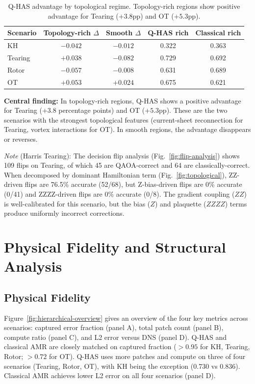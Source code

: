 \documentclass[12pt, a4paper, oneside]{report}
\begin{document}
\begin{table}[H]
\centering
\caption{Q-HAS advantage by topological regime. Topology-rich regions show positive advantage for Tearing ($+3.8$pp) and OT ($+5.3$pp).}
\label{tab:topo-regime}
\begin{tabular}{lcccc}
\toprule
\textbf{Scenario} & \textbf{Topology-rich $\Delta$} & \textbf{Smooth $\Delta$} & \textbf{Q-HAS rich} & \textbf{Classical rich} \\
\midrule
KH      & $-0.042$ & $-0.012$ & 0.322 & 0.363 \\
Tearing & $\mathbf{+0.038}$ & $-0.082$ & 0.729 & 0.692 \\
Rotor   & $-0.057$ & $-0.008$ & 0.631 & 0.689 \\
OT      & $\mathbf{+0.053}$ & $+0.024$ & 0.675 & 0.621 \\
\bottomrule
\end{tabular}
\end{table}

\textbf{Central finding:} In topology-rich regions, Q-HAS shows a positive advantage for Tearing ($+3.8$ percentage points) and OT ($+5.3$pp). These are the two scenarios with the strongest topological features (current-sheet reconnection for Tearing, vortex interactions for OT). In smooth regions, the advantage disappears or reverses.

\textit{Note} (Harris Tearing): The decision flip analysis (Fig.~\ref{fig:flip-analysis}) shows 109 flips on Tearing, of which 45 are QAOA-correct and 64 are classically-correct.  When decomposed by dominant Hamiltonian term (Fig.~\ref{fig:topological}), ZZ-driven flips are 76.5\% accurate (52/68), but Z-bias-driven flips are 0\% accurate (0/41) and ZZZZ-driven flips are 0\% accurate (0/8).  The gradient coupling ($ZZ$) is well-calibrated for this scenario, but the bias ($Z$) and plaquette ($ZZZZ$) terms produce uniformly incorrect corrections.

\section{Physical Fidelity and Structural Analysis}

\subsection{Physical Fidelity}

Figure~\ref{fig:hierarchical-overview} gives an overview of the four key metrics across scenarios: captured error fraction (panel A), total patch count (panel B), compute ratio (panel C), and L2 error versus DNS (panel D).  Q-HAS and classical AMR are closely matched on captured fraction ($>0.95$ for KH, Tearing, Rotor; $>0.72$ for OT).  Q-HAS uses more patches and compute on three of four scenarios (Tearing, Rotor, OT), with KH being the exception (0.730 vs 0.836).  Classical AMR achieves lower L2 error on all four scenarios (panel D).
\end{document}
